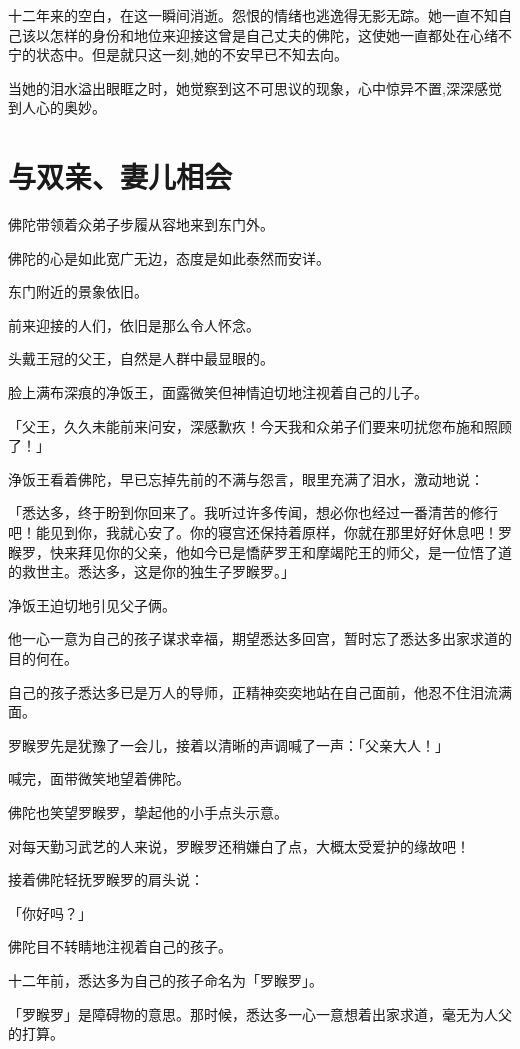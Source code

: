 \documentclass[twoside,openany]{book}
\begin{document}
十二年来的空白，在这一瞬间消逝。怨恨的情绪也逃逸得无影无踪。她一直不知自己该以怎样的身份和地位来迎接这曾是自己丈夫的佛陀，这使她一直都处在心绪不宁的状态中。但是就只这一刻,她的不安早已不知去向。

当她的泪水溢出眼眶之时，她觉察到这不可思议的现象，心中惊异不置,深深感觉到人心的奥妙。

\section{与双亲、妻儿相会}\label{sec8.3}

佛陀带领着众弟子步履从容地来到东门外。

佛陀的心是如此宽广无边，态度是如此泰然而安详。

东门附近的景象依旧。

前来迎接的人们，依旧是那么令人怀念。

头戴王冠的父王，自然是人群中最显眼的。

脸上满布深痕的净饭王，面露微笑但神情迫切地注视着自己的儿子。

「父王，久久未能前来问安，深感歉疚！今天我和众弟子们要来叨扰您布施和照顾了！」

浄饭王看着佛陀，早已忘掉先前的不满与怨言，眼里充满了泪水，激动地说：

「悉达多，终于盼到你回来了。我听过许多传闻，想必你也经过一番清苦的修行吧！能见到你，我就心安了。你的寝宫还保持着原样，你就在那里好好休息吧！罗睺罗，快来拜见你的父亲，他如今已是憍萨罗王和摩竭陀王的师父，是一位悟了道的救世主。悉达多，这是你的独生子罗睺罗。」

净饭王迫切地引见父子俩。

他一心一意为自己的孩子谋求幸福，期望悉达多回宫，暂时忘了悉达多出家求道的目的何在。

自己的孩子悉达多已是万人的导师，正精神奕奕地站在自己面前，他忍不住泪流满面。

罗睺罗先是犹豫了一会儿，接着以清晰的声调喊了一声：「父亲大人！」

喊完，面带微笑地望着佛陀。

佛陀也笑望罗睺罗，挚起他的小手点头示意。

对每天勤习武艺的人来说，罗睺罗还稍嫌白了点，大概太受爱护的缘故吧！

接着佛陀轻抚罗睺罗的肩头说：

「你好吗？」

佛陀目不转睛地注视着自己的孩子。

十二年前，悉达多为自己的孩子命名为「罗睺罗」。

「罗睺罗」是障碍物的意思。那时候，悉达多一心一意想着出家求道，毫无为人父的打算。
\end{document}
